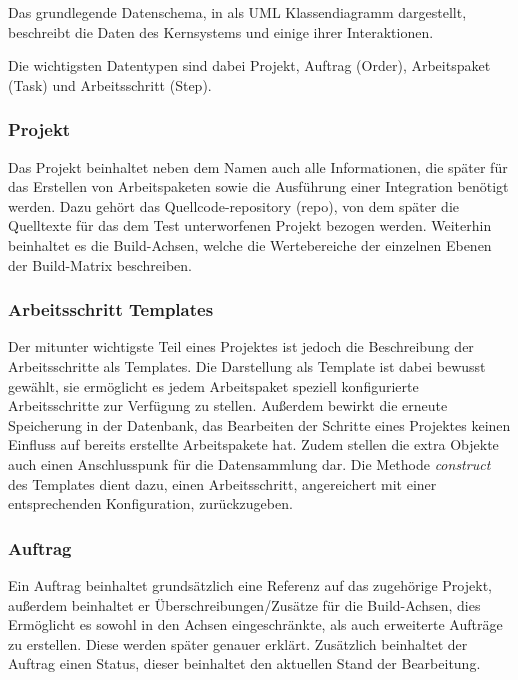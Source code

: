 Das grundlegende Datenschema, in  als UML Klassendiagramm dargestellt,
beschreibt die Daten des Kernsystems und einige ihrer Interaktionen.

Die wichtigsten Datentypen sind dabei Projekt, Auftrag (Order),
Arbeitspaket (Task) und Arbeitsschritt (Step).

\subsubsection{Projekt}

Das Projekt beinhaltet neben dem Namen auch alle Informationen,
die später für das Erstellen von Arbeitspaketen sowie
die Ausführung einer Integration benötigt werden.
Dazu gehört das Quellcode-repository (repo), von dem später
die Quelltexte für das dem Test unterworfenen Projekt bezogen werden.
Weiterhin beinhaltet es die Build-Achsen,
welche die Wertebereiche der einzelnen Ebenen der Build-Matrix
beschreiben.

\subsubsection{Arbeitsschritt Templates}

Der mitunter wichtigste Teil eines Projektes ist jedoch die Beschreibung der Arbeitsschritte als Templates.
Die Darstellung als Template ist dabei bewusst gewählt,
sie ermöglicht es jedem Arbeitspaket speziell konfigurierte Arbeitsschritte zur Verfügung zu stellen.
Außerdem bewirkt die erneute Speicherung in der Datenbank,
das Bearbeiten der Schritte eines Projektes keinen Einfluss auf bereits erstellte Arbeitspakete hat.
Zudem stellen die extra Objekte auch einen Anschlusspunk für die Datensammlung dar.
Die Methode \textit{construct} des Templates dient dazu,
einen Arbeitsschritt, angereichert mit einer entsprechenden Konfiguration, zurückzugeben.

\subsubsection{Auftrag}

Ein Auftrag beinhaltet grundsätzlich eine Referenz auf das zugehörige Projekt,
außerdem beinhaltet er Überschreibungen/Zusätze für die Build-Achsen,
dies Ermöglicht es sowohl in den Achsen eingeschränkte,
als auch erweiterte Aufträge zu erstellen.
Diese werden später genauer erklärt.
Zusätzlich beinhaltet der Auftrag einen Status, dieser beinhaltet den aktuellen Stand der Bearbeitung.

